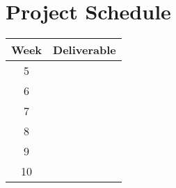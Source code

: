 \section{Project Schedule}

\begin{tabular}{c | l}
Week & Deliverable\\
\hline
5 & \\
6 & \\
7 & \\
8 & \\
9 & \\
10 & \\
\end{tabular}